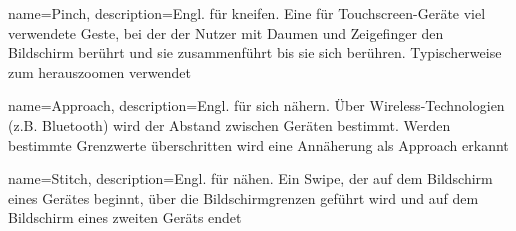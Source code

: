 {
	name=Pinch,
	description={Engl. für kneifen. Eine für Touchscreen-Geräte viel verwendete Geste, bei der der Nutzer mit Daumen und Zeigefinger den Bildschirm berührt und sie zusammenführt bis sie sich berühren. Typischerweise zum herauszoomen verwendet}
}

{
	name=Approach,
	description={Engl. für sich nähern. Über Wireless-Technologien (z.B. Bluetooth) wird der Abstand zwischen Geräten bestimmt. Werden bestimmte Grenzwerte überschritten wird eine Annäherung als Approach erkannt}
}

{
	name=Stitch,
	description={Engl. für nähen. Ein Swipe, der auf dem Bildschirm eines Gerätes beginnt, über die Bildschirmgrenzen geführt wird und auf dem Bildschirm eines zweiten Geräts endet}
}
